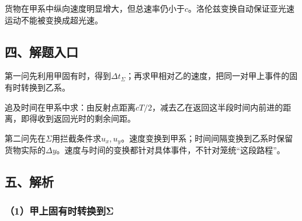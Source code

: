 \documentclass[12pt,a4paper,fontset=fandol]{ctexart}
\begin{document}
\begin{center}
\begin{minipage}{\linewidth}
\centering\begingroup{}
\ifdim\wd\diagrambox>.88\linewidth
\sbox{\diagrambox}{\resizebox{.88\linewidth}{!}{\usebox{\diagrambox}}}\fi
\ifdim\ht\diagrambox>.38\textheight
\resizebox{!}{.38\textheight}{\usebox{\diagrambox}}
\else\usebox{\diagrambox}\fi
\par{}\endgroup\end{minipage}\end{center}

货物在甲系中纵向速度明显增大，但总速率仍小于\(c\)。洛伦兹变换自动保证亚光速运动不能被变换成超光速。

\subsection{四、解题入口}\label{ux56dbux89e3ux9898ux5165ux53e3-4}

第一问先利用甲固有时，得到\(\Delta t_\Sigma\)；再求甲相对乙的速度，把同一对甲上事件的固有时转换到乙系。

追及时间在甲系中求：由反射点距离\(cT/2\)，减去乙在返回这半段时间内前进的距离，即得收到返回光时的剩余间距。

第二问先在\(\Sigma\)用拦截条件求\(u_x,u_y\)。速度变换到甲系；时间间隔变换到乙系时保留货物实际的\(\Delta y\)。速度与时间的变换都针对具体事件，不针对笼统``这段路程''。

\subsection{五、解析}\label{ux4e94ux89e3ux6790-4}

\subsubsection{（1）甲上固有时转换到Σ}\label{ux7532ux4e0aux56faux6709ux65f6ux8f6cux6362ux5230ux3c3}
\end{document}
